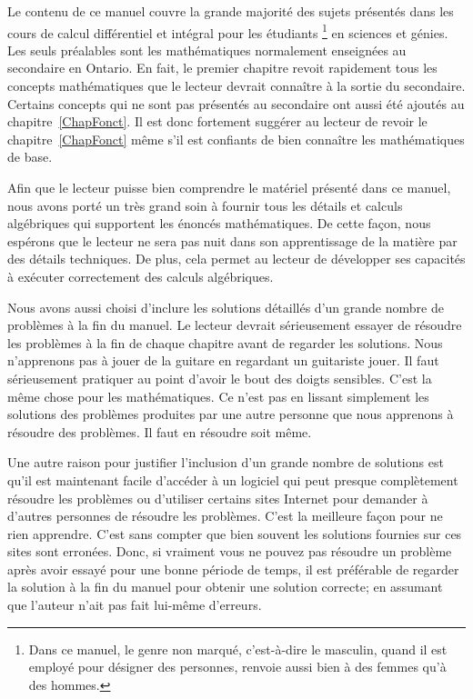 \nonumchapter{\AP}

Le contenu de ce manuel couvre la grande majorité des sujets présentés
dans les cours de calcul différentiel et intégral pour les étudiants
\footnote{Dans ce manuel, le genre non marqué, c'est-à-dire le
masculin, quand il est employé pour désigner des personnes, renvoie
aussi bien à des femmes qu'à des hommes.}
en sciences et génies.  Les seuls préalables sont les mathématiques
normalement enseignées au secondaire en Ontario.  En fait, le premier
chapitre revoit rapidement tous les concepts mathématiques que le
lecteur devrait connaître à la sortie du secondaire.  Certains
concepts qui ne sont pas présentés au secondaire ont aussi été ajoutés
au chapitre~\ref{ChapFonct}.  Il est donc fortement suggérer au
lecteur de revoir le chapitre~\ref{ChapFonct} même s'il est
confiants de bien connaître les mathématiques de base.

Afin que le lecteur puisse bien comprendre le matériel présenté dans
ce manuel, nous avons porté un très grand soin à fournir tous les
détails et calculs algébriques qui supportent les énoncés
mathématiques.  De cette façon, nous espérons que le lecteur ne sera pas
nuit dans son apprentissage de la matière par des détails techniques.
De plus, cela permet au lecteur de développer ses capacités à
exécuter correctement des calculs algébriques.

Nous avons aussi choisi d'inclure les solutions détaillés d'un grande
nombre de problèmes à la fin du manuel.  Le lecteur devrait
sérieusement essayer de résoudre les problèmes à la fin de chaque
chapitre avant de regarder les solutions.  Nous n'apprenons pas à
jouer de la guitare en regardant un guitariste jouer.  Il faut
sérieusement pratiquer au point d'avoir le bout des doigts sensibles.
C'est la même chose pour les mathématiques.  Ce n'est pas en lissant
simplement les solutions des problèmes produites par une autre
personne que nous apprenons à résoudre des problèmes.  Il faut en
résoudre soit même.

Une autre raison pour justifier l'inclusion d'un grande nombre de
solutions est qu'il est maintenant facile d'accéder à un logiciel qui
peut presque complètement résoudre les problèmes ou d'utiliser
certains sites Internet pour demander à d'autres personnes de
résoudre les problèmes.  C'est la meilleure façon pour ne rien
apprendre.  C'est sans compter que bien souvent les solutions
fournies sur ces sites sont erronées.  Donc, si vraiment vous ne
pouvez pas résoudre un problème après avoir essayé pour une bonne
période de temps, il est préférable de regarder la
solution à la fin du manuel pour obtenir une solution correcte; en
assumant que l'auteur n'ait pas fait lui-même d'erreurs. 

